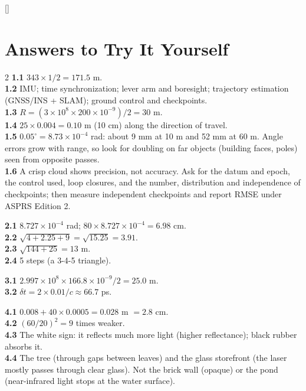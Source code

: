 \appendix
{}[\vspace{2pt}{\color{orange}\titlerule[2pt]}]
\renewcommand{\chaptermark}[1]{\markboth{Appendix \thechapter: #1}{}}

\chapter{Answers to Try It Yourself}\label{app:answers}
\small
\begin{multicols}{2}
\textbf{1.1} $343\times1/2=171.5$ m.\\
\textbf{1.2} IMU; time synchronization; lever arm and boresight; trajectory estimation (GNSS/INS + SLAM); ground control and checkpoints.\\
\textbf{1.3} $R=(3\times10^8\times200\times10^{-9})/2=30$ m.\\
\textbf{1.4} $25\times0.004=0.10$ m (10 cm) along the direction of travel.\\
\textbf{1.5} $0.05^\circ=8.73\times10^{-4}$ rad: about 9 mm at 10 m and 52 mm at 60 m. Angle errors grow with range, so look for doubling on far objects (building faces, poles) seen from opposite passes.\\
\textbf{1.6} A crisp cloud shows precision, not accuracy. Ask for the datum and epoch, the control used, loop closures, and the number, distribution and independence of checkpoints; then measure independent checkpoints and report RMSE under ASPRS Edition 2.

\textbf{2.1} $8.727\times10^{-4}$ rad; $80\times8.727\times10^{-4}=6.98$ cm.\\
\textbf{2.2} $\sqrt{4+2.25+9}=\sqrt{15.25}=3.91$.\\
\textbf{2.3} $\sqrt{144+25}=13$ m.\\
\textbf{2.4} 5 steps (a 3-4-5 triangle).

\textbf{3.1} $2.997\times10^8\times166.8\times10^{-9}/2=25.0$ m.\\
\textbf{3.2} $\delta t=2\times0.01/c\approx66.7$ ps.

\textbf{4.1} $0.008+40\times0.0005=0.028$ m $=2.8$ cm.\\
\textbf{4.2} $(60/20)^2=9$ times weaker.\\
\textbf{4.3} The white sign: it reflects much more light (higher reflectance); black rubber absorbs it.\\
\textbf{4.4} The tree (through gaps between leaves) and the glass storefront (the laser mostly passes through clear glass). Not the brick wall (opaque) or the pond (near-infrared light stops at the water surface).


\end{multicols}
